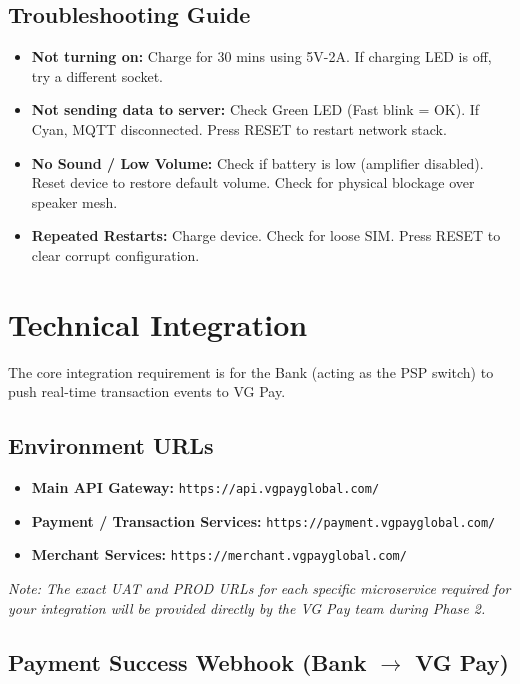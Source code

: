 \documentclass[11pt,a4paper]{article}
\begin{document}
\subsection{Troubleshooting Guide}
\begin{itemize}
    \item \textbf{Not turning on:} Charge for 30 mins using 5V-2A. If charging LED is off, try a different socket.
    \item \textbf{Not sending data to server:} Check Green LED (Fast blink = OK). If Cyan, MQTT disconnected. Press RESET to restart network stack.
    \item \textbf{No Sound / Low Volume:} Check if battery is low (amplifier disabled). Reset device to restore default volume. Check for physical blockage over speaker mesh.
    \item \textbf{Repeated Restarts:} Charge device. Check for loose SIM. Press RESET to clear corrupt configuration.
\end{itemize}

\newpage
\section{Technical Integration}

The core integration requirement is for the Bank (acting as the PSP switch) to push real-time transaction events to VG Pay.

\subsection{Environment URLs}
\begin{itemize}
    \item \textbf{Main API Gateway:} \texttt{https://api.vgpayglobal.com/}
    \item \textbf{Payment / Transaction Services:} \texttt{https://payment.vgpayglobal.com/}
    \item \textbf{Merchant Services:} \texttt{https://merchant.vgpayglobal.com/}
\end{itemize}
\textit{Note: The exact UAT and PROD URLs for each specific microservice required for your integration will be provided directly by the VG Pay team during Phase 2.}

\subsection{Payment Success Webhook (Bank \texorpdfstring{$\rightarrow$}{->} VG Pay)}
\end{document}
